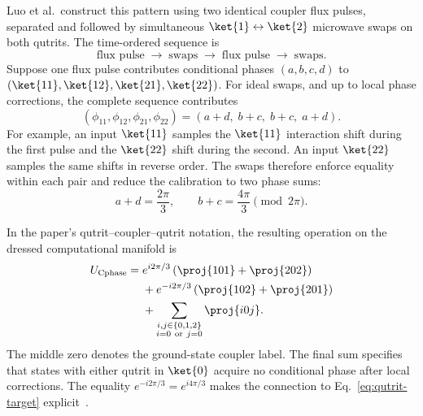 Luo et al.\ construct this pattern using two identical coupler
flux pulses, separated and followed by simultaneous
$\ket{1}\leftrightarrow\ket{2}$ microwave swaps on both qutrits.
The time-ordered sequence is
\begin{equation}
    \text{flux pulse}
    \;\longrightarrow\;
    \text{swaps}
    \;\longrightarrow\;
    \text{flux pulse}
    \;\longrightarrow\;
    \text{swaps}.
\end{equation}
Suppose one flux pulse contributes conditional phases
$(a,b,c,d)$ to
$(\ket{11},\ket{12},\ket{21},\ket{22})$.
For ideal swaps, and up to local phase corrections, the complete
sequence contributes
\begin{equation}
    (\phi_{11},\phi_{12},\phi_{21},\phi_{22})
    =(a+d,\;b+c,\;b+c,\;a+d).
    \label{eq:phase-pairing}
\end{equation}
For example, an input $\ket{11}$ samples the $\ket{11}$
interaction shift during the first pulse and the $\ket{22}$
shift during the second. An input $\ket{22}$ samples the same
shifts in reverse order. The swaps therefore enforce equality
within each pair and reduce the calibration to two phase sums:
\begin{equation}
    a+d=\frac{2\pi}{3},
    \qquad
    b+c=\frac{4\pi}{3}
    \pmod{2\pi}.
\end{equation}

In the paper's qutrit--coupler--qutrit notation, the resulting
operation on the dressed computational manifold is
\begin{equation}
\begin{aligned}
    U_{\mathrm{Cphase}}
    ={}&
    e^{i2\pi/3}
    \left(\proj{101}+\proj{202}\right)\\
    &+
    e^{-i2\pi/3}
    \left(\proj{102}+\proj{201}\right)\\
    &+
    \sum_{\substack{
        i,j\in\{0,1,2\}\\
        i=0\ \mathrm{or}\ j=0
    }}
    \proj{i0j}.
\end{aligned}
\end{equation}
The middle zero denotes the ground-state coupler label.
The final sum specifies that states with either qutrit in
$\ket{0}$ acquire no conditional phase after local corrections.
The equality $e^{-i2\pi/3}=e^{i4\pi/3}$ makes the connection to
Eq.~\eqref{eq:qutrit-target} explicit~\cite{Luo2023}.
